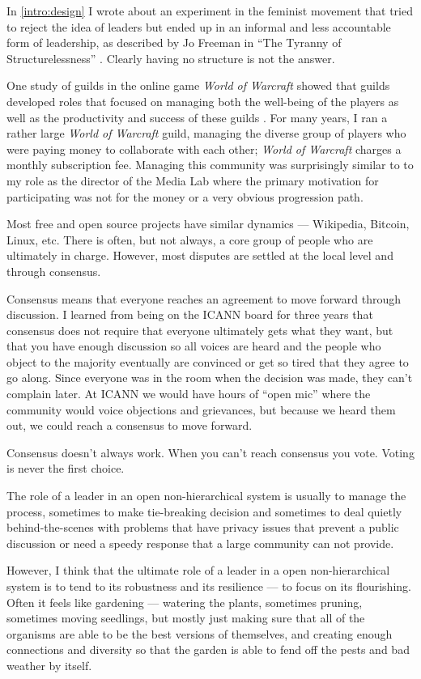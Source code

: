 In \autoref{intro:design} I wrote about an experiment in the feminist movement that tried to reject the idea of leaders but ended up in an informal and less accountable form of leadership, as described by Jo Freeman in ``The Tyranny of Structurelessness'' \cite{freeman1972tyranny}. Clearly having no structure is not the answer.

One study of guilds in the online game \emph{World of Warcraft} showed that guilds developed roles that focused on managing both the well-being of the players as well as the productivity and success of these guilds \cite{williams2014structural}. For many years, I ran a rather large \emph{World of Warcraft} guild, managing the diverse group of players who were paying money to collaborate with each other; \emph{World of Warcraft} charges a monthly subscription fee. Managing this community was surprisingly similar to to my role as the director of the Media Lab where the primary motivation for participating was not for the money or a very obvious progression path.

Most free and open source projects have similar dynamics --- Wikipedia, Bitcoin, Linux, etc. There is often, but not always, a core group of people who are ultimately in charge. However, most disputes are settled at the local level and through consensus.

Consensus means that everyone reaches an agreement to move forward through discussion. I learned from being on the ICANN board for three years that consensus does not require that everyone ultimately gets what they want, but that you have enough discussion so all voices are heard and the people who object to the majority eventually are convinced or get so tired that they agree to go along. Since everyone was in the room when the decision was made, they can't complain later. At ICANN we would have hours of ``open mic'' where the community would voice objections and grievances, but because we heard them out, we could reach a consensus to move forward.

Consensus doesn't always work. When you can't reach consensus you vote. Voting is never the first choice.

The role of a leader in an open non-hierarchical system is usually to manage the process, sometimes to make tie-breaking decision and sometimes to deal quietly behind-the-scenes with problems that have privacy issues that prevent a public discussion or need a speedy response that a large community can not provide.

However, I think that the ultimate role of a leader in a open non-hierarchical system is to tend to its robustness and its resilience --- to focus on its flourishing. Often it feels like gardening --- watering the plants, sometimes pruning, sometimes moving seedlings, but mostly just making sure that all of the organisms are able to be the best versions of themselves, and creating enough connections and diversity so that the garden is able to fend off the pests and bad weather by itself.


